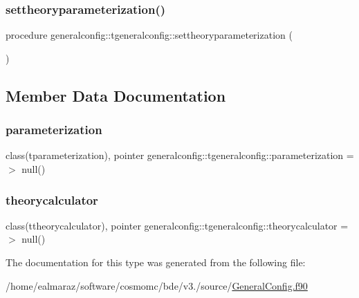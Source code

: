 \mbox{\label{structgeneralconfig_1_1tgeneralconfig_a4ce25aa4fd705c435c57d171e247902c}} 
\subsubsection{\texorpdfstring{settheoryparameterization()}{settheoryparameterization()}}
{\footnotesize\ttfamily procedure generalconfig\+::tgeneralconfig\+::settheoryparameterization (\begin{DoxyParamCaption}{ }\end{DoxyParamCaption})}



\subsection{Member Data Documentation}
\mbox{\label{structgeneralconfig_1_1tgeneralconfig_ade4cc200c0573e820d7656b740f9833c}} 
\subsubsection{\texorpdfstring{parameterization}{parameterization}}
{\footnotesize\ttfamily class(tparameterization), pointer generalconfig\+::tgeneralconfig\+::parameterization =$>$ null()}

\mbox{\label{structgeneralconfig_1_1tgeneralconfig_a1f1595e5d3315eaf5835cae4c3d3601d}} 
\subsubsection{\texorpdfstring{theorycalculator}{theorycalculator}}
{\footnotesize\ttfamily class(ttheorycalculator), pointer generalconfig\+::tgeneralconfig\+::theorycalculator =$>$ null()}



The documentation for this type was generated from the following file\+:\begin{DoxyCompactItemize}
\item 
/home/ealmaraz/software/cosmomc/bde/v3./source/\mbox{\hyperlink{GeneralConfig_8f90}{General\+Config.\+f90}}\end{DoxyCompactItemize}
